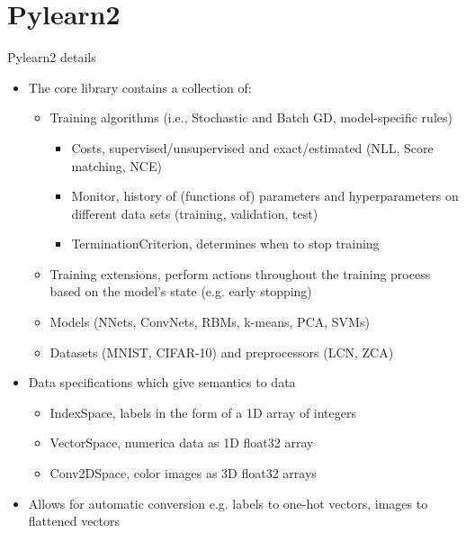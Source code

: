 \documentclass[utf8x,xcolor=pdftex,dvipsnames,table]{beamer}
\begin{document}
\section{Pylearn2}
\begin{frame}{Pylearn2 details}
  \begin{itemize}
    \item The core library contains a collection of:
    \begin{itemize}
      \item Training algorithms (i.e., Stochastic and Batch GD, model-specific rules)
      \begin{itemize}
        \item Costs, supervised/unsupervised and exact/estimated (NLL, Score matching, NCE)
        \item Monitor, history of (functions of) parameters and hyperparameters on different data sets (training, validation, test)
        \item TerminationCriterion, determines when to stop training
      \end{itemize}
      \item Training extensions, perform actions throughout the training process based on the model's state (e.g. early stopping)
      \item Models (NNets, ConvNets, RBMs, k-means, PCA, SVMs)
      \item Datasets (MNIST, CIFAR-10) and preprocessors (LCN, ZCA)
    \end{itemize}
  \item Data specifications which give semantics to data
  \begin{itemize}
    \item IndexSpace, labels in the form of a 1D array of integers
    \item VectorSpace, numerica data as 1D float32 array
    \item Conv2DSpace, color images as 3D float32 arrays
  \end{itemize}
  \item Allows for automatic conversion e.g. labels to one-hot vectors, images to flattened vectors
\end{itemize}
\end{frame}
\end{document}
